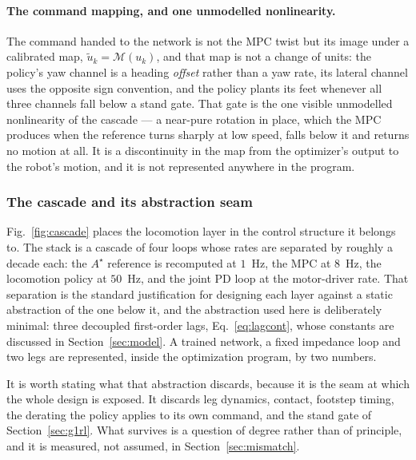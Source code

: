 \documentclass[11pt,a4paper]{article}
\newcommand{\astar}{$A^\star$}
\begin{document}
\paragraph{The command mapping, and one unmodelled nonlinearity.} The command handed to the network is not
the MPC twist but its image under a calibrated map, $\tilde u_k=\mathcal{M}(u_k)$, and that map is not a
change of units: the policy's yaw channel is a heading \emph{offset} rather than a yaw rate, its lateral
channel uses the opposite sign convention, and the policy plants its feet whenever all three channels fall
below a stand gate. That gate is the one visible unmodelled nonlinearity of the cascade --- a near-pure
rotation in place, which the MPC produces when the reference turns sharply at low speed, falls below it and
returns no motion at all. It is a discontinuity in the map from the optimizer's output to the robot's motion,
and it is not represented anywhere in the program.

\subsubsection{The cascade and its abstraction seam}
\label{sec:cascade}

Fig.~\ref{fig:cascade} places the locomotion layer in the control structure it belongs to. The stack is
a cascade of four loops whose rates are separated by roughly a decade each: the \astar{} reference is
recomputed at $1$~Hz, the MPC at $8$~Hz, the locomotion policy at $50$~Hz, and the joint PD loop at the
motor-driver rate. That separation is the standard justification for designing each layer against a static
abstraction of the one below it, and the abstraction used here is deliberately minimal: three decoupled
first-order lags, Eq.~\eqref{eq:lagcont}, whose constants are discussed in Section~\ref{sec:model}. A trained
network, a fixed impedance loop and two legs are represented, inside the optimization program, by two
numbers.

It is worth stating what that abstraction discards, because it is the seam at which the whole design is
exposed. It discards leg dynamics, contact, footstep timing, the derating the policy applies to its own
command, and the stand gate of Section~\ref{sec:g1rl}. What survives is a question of degree rather than of
principle, and it is measured, not assumed, in Section~\ref{sec:mismatch}.
\end{document}
